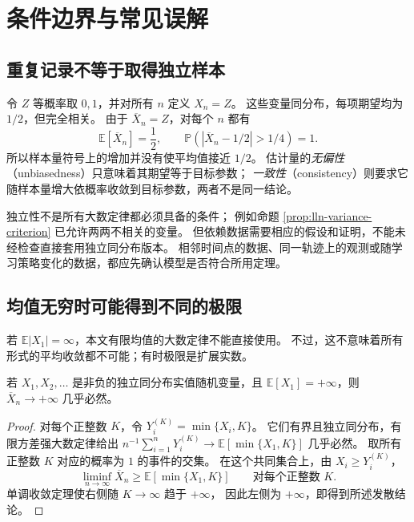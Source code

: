 \documentclass[UTF8,12pt,a4paper,fontset=fandol]{ctexart}
\begin{document}
\section{条件边界与常见误解}
\label{sec:lln-boundaries}

\subsection{重复记录不等于取得独立样本}

\begin{example}
\label{ex:lln-dependent-failure}
令 $Z$ 等概率取 $0,1$，并对所有 $n$ 定义 $X_n=Z$。
这些变量同分布，每项期望均为 $1/2$，但完全相关。
由于 $\overline X_n=Z$，对每个 $n$ 都有
\[
  \mathbb E[\overline X_n]=\frac12,\qquad
  \mathbb P(|\overline X_n-1/2|>1/4)=1.
\]
所以样本量符号上的增加并没有使平均值接近 $1/2$。
估计量的\emph{无偏性}（unbiasedness）只意味着其期望等于目标参数；
\emph{一致性}（consistency）则要求它随样本量增大依概率收敛到目标参数，两者不是同一结论。
\end{example}

独立性不是所有大数定律都必须具备的条件；
例如命题 \ref{prop:lln-variance-criterion} 已允许两两不相关的变量。
但依赖数据需要相应的假设和证明，不能未经检查直接套用独立同分布版本。
相邻时间点的数据、同一轨迹上的观测或随学习策略变化的数据，都应先确认模型是否符合所用定理。

\subsection{均值无穷时可能得到不同的极限}

若 $\mathbb E|X_1|=\infty$，本文有限均值的大数定律不能直接使用。
不过，这不意味着所有形式的平均收敛都不可能；有时极限是扩展实数。

\begin{proposition}[非负且均值无穷的情形]
\label{prop:lln-infinite-mean}
若 $X_1,X_2,\ldots$ 是非负的独立同分布实值随机变量，且
$\mathbb E[X_1]=+\infty$，则 $\overline X_n\to+\infty$ 几乎必然。
\end{proposition}

\begin{proof}
对每个正整数 $K$，令 $Y_i^{(K)}=\min\{X_i,K\}$。
它们有界且独立同分布，有限方差强大数定律给出
$n^{-1}\sum_{i=1}^nY_i^{(K)}\to\mathbb E[\min\{X_1,K\}]$ 几乎必然。
取所有正整数 $K$ 对应的概率为 $1$ 的事件的交集。
在这个共同集合上，由 $X_i\geq Y_i^{(K)}$，
\[
  \liminf_{n\to\infty}\overline X_n
  \geq\mathbb E[\min\{X_1,K\}]
  \qquad\text{对每个正整数 }K.
\]
单调收敛定理使右侧随 $K\to\infty$ 趋于 $+\infty$，
因此左侧为 $+\infty$，即得到所述发散结论。
\end{proof}
\end{document}

